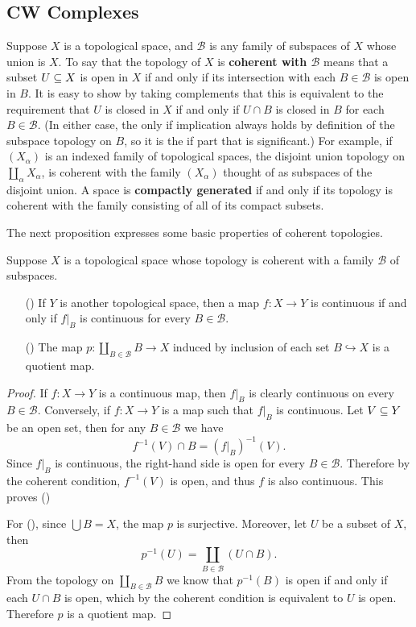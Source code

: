 \subsection{CW Complexes}
Suppose $X$ is a topological space, and $\mathcal{B}$ is any family of subspaces of $X$ whose union is $X$. To say that the topology of $X$ is 
\textbf{coherent with $\mathcal{B}$} means that a subset $U\subseteq X$ is open in $X$ if and only if its intersection with each $B\in\mathcal{B}$ is open in $B$. It is easy 
to show by taking complements that this is equivalent to the requirement that $U$ is closed in $X$ if and only if $U\cap B$ is closed in $B$ for each $B\in\mathcal{B}$. 
(In either case, the only if implication always holds by definition of the subspace topology on $B$, so it is the if part that is significant.) For example, if 
$(X_\alpha)$ is an indexed family of topological spaces, the disjoint union topology on $\coprod_\alpha X_\alpha$, is coherent with the family $(X_\alpha)$ thought of 
as subspaces of the disjoint union. A space is \textbf{compactly generated} if and only if its topology is coherent with the family consisting of all of its compact 
subsets.\par
The next proposition expresses some basic properties of coherent topologies.
\begin{proposition}\label{coherent topo}
Suppose $X$ is a topological space whose topology is coherent with a family $\mathcal{B}$ of subspaces.
\begin{itemize}
\item[(\rmnum{1})] If $Y$ is another topological space, then a map $f:X\to Y$ is continuous if and only if $f|_B$ is continuous for every $B\in\mathcal{B}$.
\item[(\rmnum{2})] The map $p:\coprod_{B\in\mathcal{B}}B\to X$ induced by inclusion of each set $B\hookrightarrow X$ is a quotient map.
\end{itemize}
\end{proposition}
\begin{proof}
If $f:X\to Y$ is a continuous map, then $f|_B$ is clearly continuous on every $B\in\mathcal{B}$. Conversely, if $f:X\to Y$ is a map such that $f|_B$ is continuous. Let 
$V\subseteq Y$ be an open set, then for any $B\in\mathcal{B}$ we have
\[f^{-1}(V)\cap B=(f|_B)^{-1}(V).\]
Since $f|_B$ is continuous, the right-hand side is open for every $B\in\mathcal{B}$. Therefore by the coherent condition, $f^{-1}(V)$ is open, and thus $f$ is also 
continuous. This proves ()\par
For (), since $\bigcup B=X$, the map $p$ is surjective. Moreover, let $U$ be a subset of $X$, then
\[p^{-1}(U)=\coprod_{B\in\mathcal{B}}(U\cap B).\]
From the topology on $\coprod_{B\in\mathcal{B}}B$ we know that $p^{-1}(B)$ is open if and only if each $U\cap B$ is open, which by the coherent condition is equivalent 
to $U$ is open. Therefore $p$ is a quotient map.
\end{proof}
